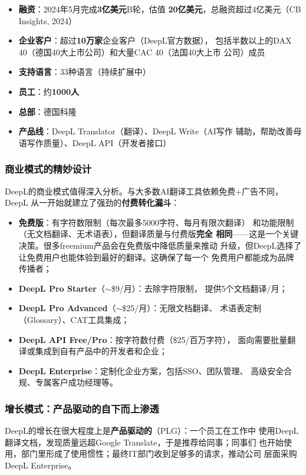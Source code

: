 \begin{corebox}[DeepL核心数据（截至2025年底）]
\begin{itemize}
  \item \textbf{融资}：2024年5月完成\textbf{3亿美元}B轮，估值
    \textbf{20亿美元}，总融资超过4亿美元（CB Insights, 2024）
  \item \textbf{企业客户}：超过\textbf{10万家}企业客户（DeepL官方数据），
    包括半数以上的DAX 40（德国40大上市公司）和大量CAC 40（法国40大上市
    公司）成员
  \item \textbf{支持语言}：33种语言（持续扩展中）
  \item \textbf{员工}：约\textbf{1000人}
  \item \textbf{总部}：德国科隆
  \item \textbf{产品线}：DeepL Translator（翻译）、DeepL Write（AI写作
    辅助，帮助改善母语写作质量）、DeepL API（开发者接口）
\end{itemize}
\end{corebox}

\subsubsection{商业模式的精妙设计}
DeepL的商业模式值得深入分析。与大多数AI翻译工具依赖免费+广告不同，DeepL
从一开始就建立了强劲的\textbf{付费转化漏斗}：

\begin{itemize}
  \item \textbf{免费版}：有字符数限制（每次最多5000字符、每月有限次翻译）
    和功能限制（无文档翻译、无术语表），但翻译质量与付费版\textbf{完全
    相同}——这是一个关键决策。很多freemium产品会在免费版中降低质量来推动
    升级，但DeepL选择了让免费用户也能体验到最好的翻译。这确保了每一个
    免费用户都能成为品牌传播者；
  \item \textbf{DeepL Pro Starter}（$\sim$\$9/月）：去除字符限制，
    提供5个文档翻译/月；
  \item \textbf{DeepL Pro Advanced}（$\sim$\$25/月）：无限文档翻译、
    术语表定制（Glossary）、CAT工具集成；
  \item \textbf{DeepL API Free/Pro}：按字符数付费（\$25/百万字符），
    面向需要批量翻译或集成到自有产品中的开发者和企业；
  \item \textbf{DeepL Enterprise}：定制化企业方案，包括SSO、团队管理、
    高级安全合规、专属客户成功经理等。
\end{itemize}

\subsubsection{增长模式：产品驱动的自下而上渗透}
DeepL的增长在很大程度上是\textbf{产品驱动的}（PLG）：一个员工在工作中
使用DeepL翻译文档，发现质量远超Google Translate，于是推荐给同事；同事们
也开始使用，部门里形成了使用惯性；最终IT部门收到足够多的请求，推动公司
层面采购DeepL Enterprise。

